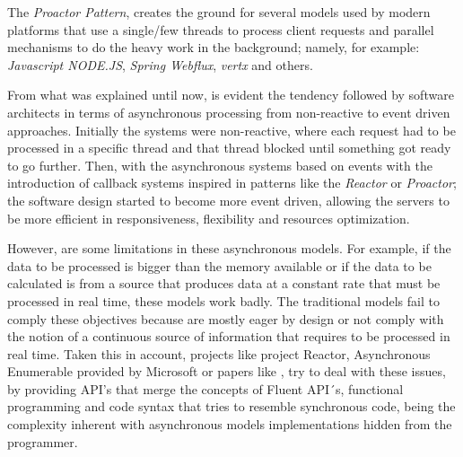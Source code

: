 The \textit{Proactor Pattern}, creates the ground for several models used by modern platforms that use a single/few threads to process client requests and parallel mechanisms to do the heavy work in the background; namely, for example: \textit{Javascript NODE.JS}, \textit{Spring Webflux}, \textit{vertx} and others.

From what was explained until now, is evident the tendency followed by software architects in terms of asynchronous processing from non-reactive to event driven approaches. Initially the systems were non-reactive, where each request had to be processed in a 
specific thread and that thread blocked until something got ready to go further. 
Then, with the asynchronous systems based on events with the introduction of callback systems inspired in patterns like the \textit{Reactor} or \textit{Proactor}; the software design started to become more event driven, allowing the servers to be more efficient in responsiveness, flexibility and resources optimization. 

However, are some limitations in these asynchronous models. For example, if the data to be processed is bigger than the memory available or if the data to be calculated is from a source that produces data at a constant rate that must be processed in real time, these models work badly.  
The traditional models fail to comply these objectives because are mostly eager by design or not comply with the notion of a continuous source of information that requires to be processed in real time.
Taken this in account, projects like project Reactor, Asynchronous Enumerable provided by Microsoft or papers like \cite{LAZYVSEAGER}, try to deal with these issues, by providing API's that merge the concepts of Fluent API´s, functional programming and code syntax that tries to resemble synchronous code, being the complexity inherent with asynchronous models implementations hidden from the programmer. 





